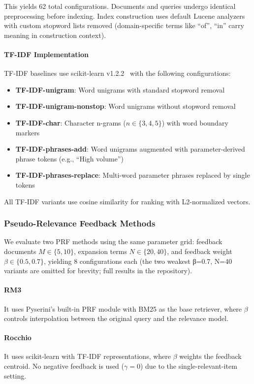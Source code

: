 \documentclass[preprint,12pt]{elsarticle}
\begin{document}
This yields 62 total configurations. Documents and queries undergo identical preprocessing before indexing. Index construction uses default Lucene analyzers with custom stopword lists removed (domain-specific terms like ``of'', ``in'' carry meaning in construction context).

\paragraph{TF-IDF Implementation}
TF-IDF baselines use scikit-learn v1.2.2~\citep{pedregosa2011scikit} with the following configurations:
\begin{itemize}
    \item \textbf{TF-IDF-unigram}: Word unigrams with standard stopword removal
    \item \textbf{TF-IDF-unigram-nonstop}: Word unigrams without stopword removal
    \item \textbf{TF-IDF-char}: Character n-grams ($n \in \{3,4,5\}$) with word boundary markers
    \item \textbf{TF-IDF-phrases-add}: Word unigrams augmented with parameter-derived phrase tokens (e.g., ``High volume'')
    \item \textbf{TF-IDF-phrases-replace}: Multi-word parameter phrases replaced by single tokens
\end{itemize}
All TF-IDF variants use cosine similarity for ranking with L2-normalized vectors.

\subsubsection{Pseudo-Relevance Feedback Methods}

We evaluate two PRF methods using the same parameter grid: feedback documents $M \in \{5, 10\}$, expansion terms $N \in \{20, 40\}$, and feedback weight $\beta \in \{0.5, 0.7\}$, yielding 8 configurations each (the two weakest β=0.7, N=40 variants are
omitted for brevity; full results in the repository).

\paragraph{RM3} It uses Pyserini's built-in PRF module with BM25 as the base retriever, where $\beta$ controls interpolation between the original query and the relevance model.

\paragraph{Rocchio} It uses scikit-learn with TF-IDF representations, where $\beta$ weights the feedback centroid. No negative feedback is used ($\gamma = 0$) due to the single-relevant-item setting.
\end{document}
